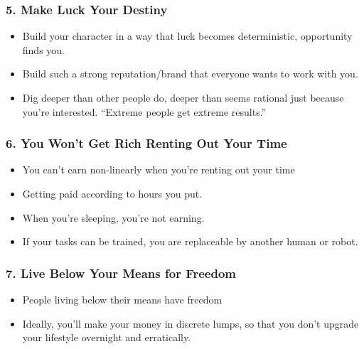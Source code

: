 \begin{frame}[fragile]
\frametitle{5. Make Luck Your Destiny}
\begin{itemize}
\item Build your character in a way that luck becomes deterministic, opportunity finds you.
\item Build such a strong reputation/brand that everyone wants to work with you.
\item  Dig deeper than other people do, deeper than seems rational just because you’re interested. ``Extreme people get extreme results.''
\end{itemize}
\end{frame}

\begin{frame}[fragile]
\frametitle{6. You Won't Get Rich Renting Out Your Time}
\begin{itemize}
\item You can't earn non-linearly when you're renting out your time
\item Getting paid according to hours you put.
\item When you're sleeping, you’re not earning.
\item If your tasks can be trained, you are replaceable by another human or robot.
\end{itemize}
\end{frame}


\begin{frame}[fragile]
\frametitle{7. Live Below Your Means for Freedom}
\begin{itemize}
\item People living below their means have freedom
\item Ideally, you’ll make your money in discrete lumps, so that you don't upgrade your lifestyle overnight and erratically.
\end{itemize}
\end{frame}


